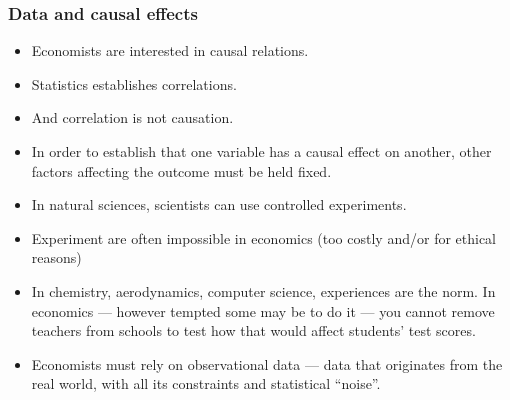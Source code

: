 

\begin{frame}
\frametitle{Data and causal effects}
\begin{itemize}
\item Economists are interested in causal relations.
\item Statistics establishes correlations.
\item And correlation is not causation.
\item In order to establish that one variable has a causal effect on another, other factors affecting the outcome must be held fixed.
\item In natural sciences, scientists can use controlled experiments.
\item Experiment are often impossible in economics (too costly and/or for ethical reasons)
\item In chemistry,  aerodynamics, computer science, experiences are the norm. In economics --- however tempted some may be to do it --- you cannot remove teachers from schools to test how that would affect students' test scores. 
\item Economists must rely on observational data --- data that originates from the real world, with all its constraints and statistical ``noise''. 
\end{itemize}
\end{frame}

